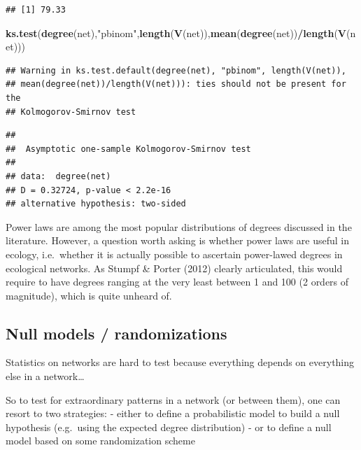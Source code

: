 \documentclass[
]{book}
\newenvironment{Shaded}{\begin{snugshade}}{\end{snugshade}}
\newcommand{\FunctionTok}[1]{\textcolor[rgb]{0.13,0.29,0.53}{\textbf{#1}}}
\newcommand{\NormalTok}[1]{#1}
\newcommand{\SpecialCharTok}[1]{\textcolor[rgb]{0.81,0.36,0.00}{\textbf{#1}}}
\newcommand{\StringTok}[1]{\textcolor[rgb]{0.31,0.60,0.02}{#1}}
\theoremstyle{definition}
\theoremstyle{definition}
\theoremstyle{definition}
\theoremstyle{definition}
\theoremstyle{remark}
\begin{document}
\begin{verbatim}
## [1] 79.33
\end{verbatim}

\begin{Shaded}
\begin{Highlighting}[]
\FunctionTok{ks.test}\NormalTok{(}\FunctionTok{degree}\NormalTok{(net),}\StringTok{"pbinom"}\NormalTok{,}\FunctionTok{length}\NormalTok{(}\FunctionTok{V}\NormalTok{(net)),}\FunctionTok{mean}\NormalTok{(}\FunctionTok{degree}\NormalTok{(net))}\SpecialCharTok{/}\FunctionTok{length}\NormalTok{(}\FunctionTok{V}\NormalTok{(net)))}
\end{Highlighting}
\end{Shaded}

\begin{verbatim}
## Warning in ks.test.default(degree(net), "pbinom", length(V(net)),
## mean(degree(net))/length(V(net))): ties should not be present for the
## Kolmogorov-Smirnov test
\end{verbatim}

\begin{verbatim}
## 
##  Asymptotic one-sample Kolmogorov-Smirnov test
## 
## data:  degree(net)
## D = 0.32724, p-value < 2.2e-16
## alternative hypothesis: two-sided
\end{verbatim}

Power laws are among the most popular distributions of degrees discussed in the literature. However, a question worth asking is whether power laws are useful in ecology, i.e.~whether it is actually possible to ascertain power-lawed degrees in ecological networks.
As Stumpf \& Porter (2012) clearly articulated, this would require to have degrees ranging at the very least between 1 and 100 (2 orders of magnitude), which is quite unheard of.

\subsection{Null models / randomizations}\label{null-models-randomizations}

Statistics on networks are hard to test because everything depends on everything else in a network\ldots{}

So to test for extraordinary patterns in a network (or between them), one can resort to two strategies:
- either to define a probabilistic model to build a null hypothesis (e.g.~using the expected degree distribution)
- or to define a null model based on some randomization scheme
\end{document}
